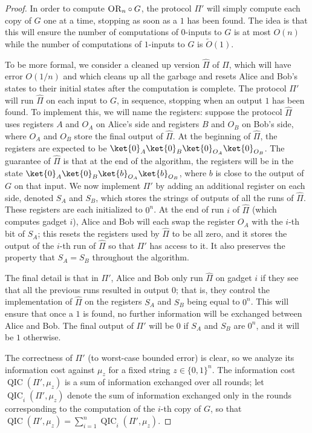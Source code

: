 \documentclass[10pt,a4paper]{article}
\theoremstyle{definition}
\newcommand{\tO}{\tilde{O}}
\newcommand{\B}{\{0,1\}}
\renewcommand{\>}{\rangle}
\newcommand{\<}{\langle}
\newcommand{\OR}{\textsc{OR}}
\DeclareMathOperator{\QIC}{QIC}
\begin{document}
\begin{proof}
In order to compute $\OR_n\circ G$, the
protocol $\Pi'$ will simply compute each copy of $G$ one at a time,
stopping as soon as a $1$ has been found. The idea is that this
will ensure the number of computations of $0$-inputs to $G$
is at most $O(n)$ while the number of computations of
$1$-inputs to $G$ is $\tO(1)$.

To be more formal, we consider a cleaned up version
$\hat{\Pi}$ of $\Pi$, which will have error $O(1/n)$
and which cleans up all the garbage and resets Alice and Bob's
states to their initial states after the computation is complete.
The protocol $\Pi'$ will run $\hat{\Pi}$ on each input to $G$,
in sequence, stopping when an output $1$ has been found.
To implement this, we will name the registers:
suppose the protocol $\hat{\Pi}$ uses registers $A$ and $O_A$
on Alice's side and registers $B$ and $O_B$ on Bob's side,
where $O_A$ and $O_B$ store the final output of $\hat{\Pi}$.
At the beginning of $\hat{\Pi}$, the registers are expected
to be $\ket{0}_A\ket{0}_B\ket{0}_{O_A}\ket{0}_{O_B}$.
The guarantee of $\hat{\Pi}$ is that at the end of the algorithm,
the registers will be in the state
$\ket{0}_A\ket{0}_B\ket{b}_{O_A}\ket{b}_{O_B}$,
where $b$ is close to the output of $G$ on that input.
We now implement $\Pi'$ by adding an additional register
on each side, denoted $S_A$ and $S_B$, which stores the strings
of outputs of all the runs of $\hat{\Pi}$. These
registers are each initialized to $0^n$. At the
end of run $i$ of $\hat{\Pi}$ (which computes gadget $i$),
Alice and Bob will each swap the register $O_A$ with
the $i$-th bit of $S_A$; this resets the registers
used by $\hat{\Pi}$ to be all zero, and it stores the output
of the $i$-th run of $\hat{\Pi}$ so that $\Pi'$ has access
to it. It also preserves the property that $S_A=S_B$ throughout
the algorithm.

The final detail is that in $\Pi'$, Alice and Bob only run
$\hat{\Pi}$ on gadget $i$ if they see that all the previous runs
resulted in output $0$; that is, they control the implementation
of $\hat{\Pi}$ on the registers $S_A$ and $S_B$ being equal to $0^n$.
This will ensure that once a $1$ is found, no further information
will be exchanged between Alice and Bob. The final output
of $\Pi'$ will be $0$ if $S_A$ and $S_B$ are $0^n$, and it will be
$1$ otherwise.

The correctness of $\Pi'$ (to worst-case bounded error) is clear,
so we analyze its information cost against $\mu_z$ for a
fixed string $z\in\B^n$. The information cost $\QIC(\Pi',\mu_z)$
is a sum of information exchanged over all rounds;
let $\QIC_i(\Pi',\mu_z)$ denote the sum of information
exchanged only in the rounds corresponding to the computation
of the $i$-th copy of $G$, so that
$\QIC(\Pi',\mu_z)=\sum_{i=1}^n\QIC_i(\Pi',\mu_z)$.


\end{proof}
\end{document}
